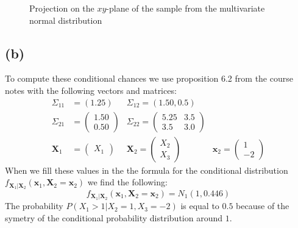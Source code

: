 \documentclass[a4paper]{article}
\begin{document}
\begin{figure}[H]
	\centering
	
	\caption{Projection on the $xy$-plane of the sample from the multivariate normal distribution}
	\label{fig:sample}
\end{figure}

\newpage
\subsection*{(b)}
\noindent {}

To compute these conditional chances we use proposition 6.2 from the course notes with the following vectors and matrices:
\begin{align*}
	\Sigma_{11} &= \left(1.25\right) &\Sigma_{12} = \left( 1.50, 0.5\right)\\
	\Sigma_{21} &= \begin{pmatrix} 1.50\\ 0.50 \end{pmatrix} &\Sigma_{22} = \begin{pmatrix} 5.25 & 3.5\\ 3.5 & 3.0 \end{pmatrix}\\
	\mathbf{X}_1 &= \begin{pmatrix} X_1 \end{pmatrix} &\mathbf{X}_2=\begin{pmatrix}X_2\\X_3\end{pmatrix} &\mathbf{x}_2 = \begin{pmatrix} 1\\-2 \end{pmatrix}
\end{align*}
When we fill these values in the the formula for the conditional distribution $f_{\mathbf{X}_1|\mathbf{X}_2}(\mathbf{x}_1, \mathbf{X}_2 = \mathbf{x}_2)$ we find the following:
\begin{equation}
	f_{\mathbf{X}_1|\mathbf{X}_2}(\mathbf{x}_1, \mathbf{X}_2 = \mathbf{x}_2) = N_1(1, 0.446)
\end{equation}
The probability $P(X_1>1|X_2=1, X_3=-2)$ is equal to $0.5$ because of the symetry of the conditional probability distribution around $1$.
\end{document}
